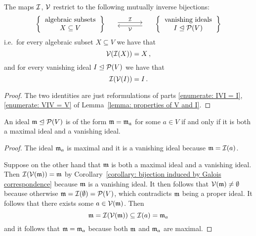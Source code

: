 \begin{corollary}
  \label{corollary: bijection induced by Galois correspondence}
  The maps $\mathcal{I}$, $\mathcal{V}$ restrict to the following mutually inverse bijections:
  \[
    \begin{matrix}
        \left\{
          \begin{tabular}{c}
              algebraic subsets \\
              $X \subseteq V$
          \end{tabular}
        \right\}
      & \begin{tikzcd}[column sep = large]
            {}
            \arrow[shift left]{r}{\mc{I}}
          & {}
            \arrow[shift left]{l}{\mc{V}}
        \end{tikzcd}
      & \left\{
          \begin{tabular}{c}
            vanishing ideals \\
            $I \idealeq \mc{P}(V)$
          \end{tabular}
        \right\}
    \end{matrix}
  \]
  i.e.\ for every algebraic subset $X \subseteq V$ we have that
  \[
    \mathcal{V}(\mathcal{I}(X)) = X \,,
  \]
  and for every vanishing ideal $I \trianglelefteq \mathcal{P}(V)$ we have that
  \[
    \mathcal{I}(\mathcal{V}(I)) = I \,.
  \]
\end{corollary}


\begin{proof}
  The two identities are just reformulations of parts \ref*{enumerate: IVI = I}, \ref*{enumerate: VIV = V} of Lemma~\ref{lemma: properties of V and I}.
\end{proof}


\begin{lemma}
  \label{lemma: correspence between points and vanishing maximal ideals}
  An ideal $\mathfrak{m} \trianglelefteq \mathcal{P}(V)$ is of the form $\mathfrak{m} = \mathfrak{m}_a$ for some $a \in V$ if and only if it is both a maximal ideal and a vanishing ideal.
\end{lemma}


\begin{proof}
  The ideal $\mathfrak{m}_a$ is maximal and it is a vanishing ideal because $\mathfrak{m} = \mathcal{I}(a)$.
  
  Suppose on the other hand that $\mathfrak{m}$ is both a maximal ideal and a vanishing ideal.
  Then $\mathcal{I}(\mathcal{V}(\mathfrak{m})) = \mathfrak{m}$ by Corollary~\ref{corollary: bijection induced by Galois correspondence} because $\mathfrak{m}$ is a vanishing ideal.
  It then follows that $\mathcal{V}(\mathfrak{m}) \neq \emptyset$ because otherwise $\mathfrak{m} = \mathcal{I}(\emptyset) = \mathcal{P}(V)$, which contradicts $\mathfrak{m}$ being a proper ideal.
  It follows that there exists some $a \in \mathcal{V}(\mathfrak{m})$.
  Then
  \[
              \mathfrak{m}
    =         \mathcal{I}(\mathcal{V}(\mathfrak{m}))
    \subseteq \mathcal{I}(a)
    =         \mathfrak{m}_a
  \]
  and it follows that $\mathfrak{m} = \mathfrak{m}_a$ because both $\mathfrak{m}$ and $\mathfrak{m}_a$ are maximal.
\end{proof}

